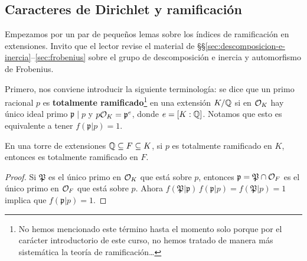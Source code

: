 \subsection{Caracteres de Dirichlet y ramificación}

Empezamos por un par de pequeños lemas sobre los índices de ramificación en
extensiones. Invito que el lector revise el material de
\S\S\ref{sec:descomposicion-e-inercia}--\ref{sec:frobenius} sobre el grupo
de descomposición e inercia y automorfismo de Frobenius.

Primero, nos conviene introducir la siguiente terminología: se dice que un primo
racional $p$ es \textbf{totalmente ramificado}\footnote{No hemos mencionado este
  término hasta el momento solo porque por el carácter introductorio de este
  curso, no hemos tratado de manera más sistemática la teoría de
  ramificación\ldots} en una extensión $K/\mathbb{Q}$ si en $\mathcal{O}_K$ hay único ideal
primo $\mathfrak{p}\mid p$ y $p\mathcal{O}_K = \mathfrak{p}^e$, donde $e = [K :
  \mathbb{Q}]$. Notamos que esto es equivalente a tener $f (\mathfrak{p}|p) = 1$.

\begin{lema}
  En una torre de extensiones $\mathbb{Q} \subseteq F \subseteq K$,
  si $p$ es totalmente ramificado en $K$, entonces es totalmente ramificado en
  $F$.

  \begin{proof}
    Si $\mathfrak{P}$ es el único primo en $\mathcal{O}_K$ que está sobre $p$, entonces
    $\mathfrak{p} = \mathfrak{P}\cap \mathcal{O}_F$ es el único primo en $\mathcal{O}_F$
    que está sobre $p$. Ahora
    $f (\mathfrak{P}|\mathfrak{p})\,f (\mathfrak{p}|p) = f (\mathfrak{P}|p) = 1$
    implica que $f (\mathfrak{p}|p) = 1$.
  \end{proof}
\end{lema}

